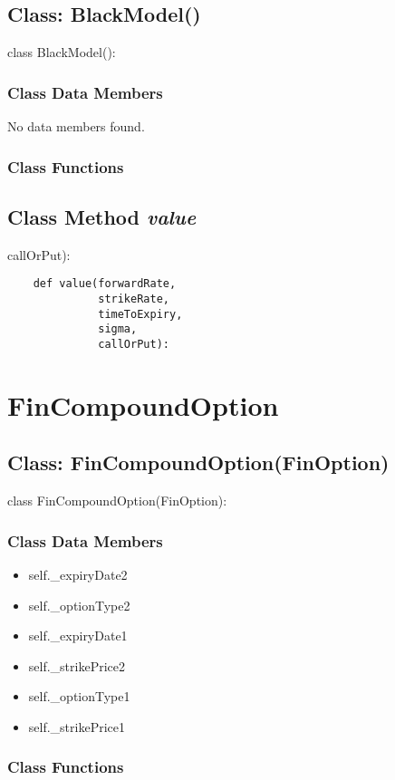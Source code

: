 \documentclass[twoside,11pt]{book}
\begin{document}
\subsection{Class: BlackModel()}
class BlackModel():

\subsubsection{Class Data Members}
No data members found.

\subsubsection{Class Functions}

\subsection{Class Method {\it value}}
callOrPut):

\begin{lstlisting}
    def value(forwardRate,
              strikeRate,
              timeToExpiry,
              sigma,
              callOrPut):
\end{lstlisting}

\newpage
\section{FinCompoundOption}

\subsection{Class: FinCompoundOption(FinOption)}
class FinCompoundOption(FinOption):

\subsubsection{Class Data Members}
\begin{itemize}
\item{self.\_expiryDate2}
\item{self.\_optionType2}
\item{self.\_expiryDate1}
\item{self.\_strikePrice2}
\item{self.\_optionType1}
\item{self.\_strikePrice1}
\end{itemize}

\subsubsection{Class Functions}
\end{document}
